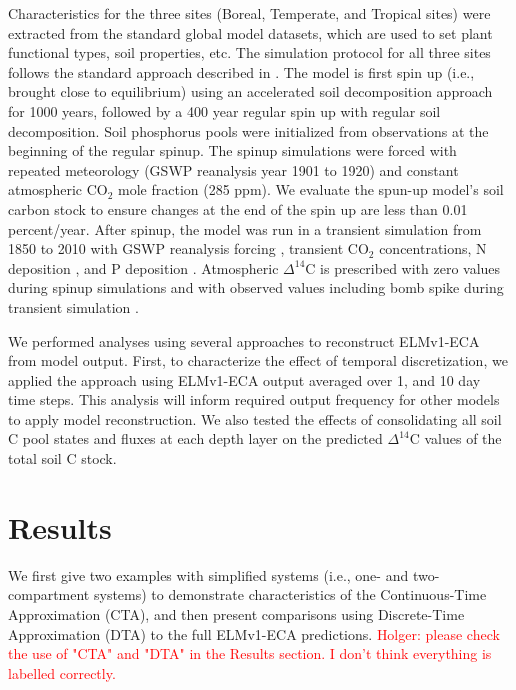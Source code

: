 \documentclass[11pt,a4paper]{article}
\newcommand{\red}[1]{\textcolor{red}{#1}}
\newcommand{\gray}[1]{\textcolor{gray}{#1}}
\begin{document}
    Characteristics for the three sites (Boreal, Temperate, and Tropical sites) were extracted from the standard global model datasets, which are used to set plant functional types, soil properties, etc. The simulation protocol for all three sites follows the standard approach described in \citet{Oleson2010}. The model is first spin up (i.e., brought close to equilibrium) using an accelerated soil decomposition approach \citep{Koven2013} for 1000 years, followed by a 400 year regular spin up with regular soil decomposition. Soil phosphorus pools were initialized from observations \citep{Yang2013} at the beginning of the regular spinup. The spinup simulations were forced with repeated meteorology (GSWP reanalysis \citep{Dirmeyer2006} year 1901 to 1920) and constant atmospheric CO$_2$ mole fraction (285 ppm). We evaluate the spun-up model's soil carbon stock to ensure changes at the end of the spin up are less than 0.01 percent/year. After spinup, the model was run in a transient simulation from 1850 to 2010 with GSWP reanalysis forcing \citep{Dirmeyer2006}, transient CO$_2$ concentrations, N deposition \citep{Lamarque2005}, and P deposition \citep{Mahowald2008}. Atmospheric   $\Delta^{14}$C  is prescribed with zero values during spinup simulations and with observed values including bomb spike during transient simulation \citep{Levin2010}.
    
    
    
    We performed analyses using several approaches to reconstruct ELMv1-ECA from model output. First, to characterize the effect of temporal discretization, we applied the approach using ELMv1-ECA output averaged over 1, and 10 day time steps. 
    This analysis will inform required output frequency for other models to apply model reconstruction. We also tested the effects of consolidating all soil C pool states and fluxes at each depth layer on the predicted $\Delta^{14}$C values of the total soil C stock. 

\section{Results}
We first give two examples with simplified systems (i.e., one- and two-compartment systems) to demonstrate characteristics of the Continuous-Time Approximation (CTA), and then present comparisons using Discrete-Time Approximation (DTA) to the full ELMv1-ECA predictions. \red{Holger: please check the use of "CTA" and "DTA" in the Results section. I don't think everything is labelled correctly.}
\end{document}
